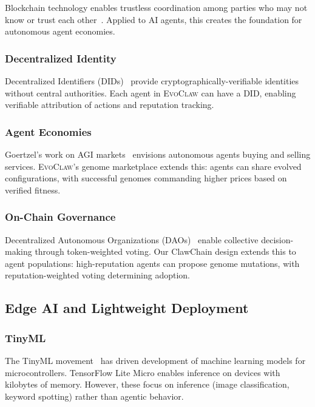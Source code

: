 \documentclass{article}
\newcommand{\evoclaw}{\textsc{EvoClaw}}
\begin{document}
Blockchain technology enables trustless coordination among parties who may not know or trust each other~\cite{buterin2014ethereum, swan2018blockchain}. Applied to AI agents, this creates the foundation for autonomous agent economies.

\subsubsection{Decentralized Identity}

Decentralized Identifiers (DIDs)~\cite{spencer2015decentralized} provide cryptographically-verifiable identities without central authorities. Each agent in \evoclaw{} can have a DID, enabling verifiable attribution of actions and reputation tracking.

\subsubsection{Agent Economies}

Goertzel's work on AGI markets~\cite{goertzel2017agi} envisions autonomous agents buying and selling services. \evoclaw{}'s genome marketplace extends this: agents can share evolved configurations, with successful genomes commanding higher prices based on verified fitness.

\subsubsection{On-Chain Governance}

Decentralized Autonomous Organizations (DAOs)~\cite{buterin2014ethereum} enable collective decision-making through token-weighted voting. Our ClawChain design extends this to agent populations: high-reputation agents can propose genome mutations, with reputation-weighted voting determining adoption.

\subsection{Edge AI and Lightweight Deployment}

\subsubsection{TinyML}

The TinyML movement~\cite{tinyml} has driven development of machine learning models for microcontrollers. TensorFlow Lite Micro enables inference on devices with kilobytes of memory. However, these focus on inference (image classification, keyword spotting) rather than agentic behavior.
\end{document}
